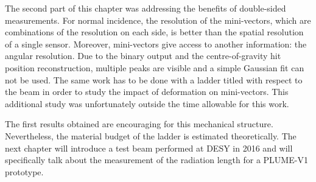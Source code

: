   The second part of this chapter was addressing the benefits of double-sided measurements.
  For normal incidence, the resolution of the mini-vectors, which are combinations of the resolution on each side, is better than the spatial resolution of a single sensor.
  Moreover, mini-vectors give access to another information: the angular resolution.
  Due to the binary output and the centre-of-gravity hit position reconstruction, multiple peaks are visible and a simple Gaussian fit can not be used. 
  The same work has to be done with a ladder titled with respect to the beam in order to study the impact of deformation on mini-vectors.
  This additional study was unfortunately outside the time allowable for this work.

  The first results obtained are encouraging for this mechanical structure.
  Nevertheless, the material budget of the ladder is estimated theoretically.
  The next chapter will introduce a test beam performed at \gls{DESY} in 2016 and will specifically talk about the measurement of the radiation length for a \gls{PLUME}-V1 prototype.

